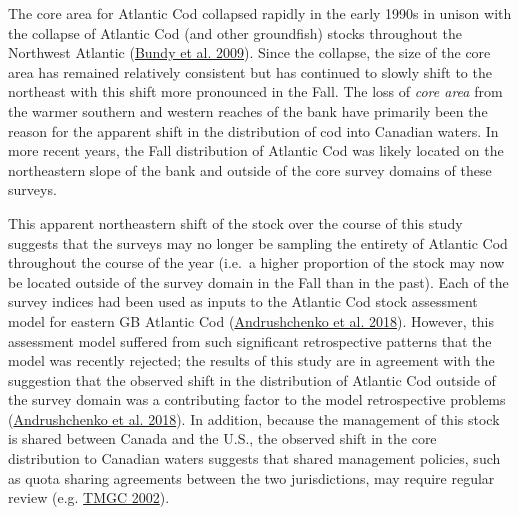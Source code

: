 \documentclass[
]{article}
\begin{document}
The core area for Atlantic Cod collapsed rapidly in the early 1990s in unison with the collapse of Atlantic Cod (and other groundfish) stocks throughout the Northwest Atlantic (\protect\hyperlink{ref-bundySealsCodForage2009}{Bundy et al. 2009}). Since the collapse, the size of the core area has remained relatively consistent but has continued to slowly shift to the northeast with this shift more pronounced in the Fall. The loss of \emph{core area} from the warmer southern and western reaches of the bank have primarily been the reason for the apparent shift in the distribution of cod into Canadian waters. In more recent years, the Fall distribution of Atlantic Cod was likely located on the northeastern slope of the bank and outside of the core survey domains of these surveys.

This apparent northeastern shift of the stock over the course of this study suggests that the surveys may no longer be sampling the entirety of Atlantic Cod throughout the course of the year (i.e.~a higher proportion of the stock may now be located outside of the survey domain in the Fall than in the past). Each of the survey indices had been used as inputs to the Atlantic Cod stock assessment model for eastern GB Atlantic Cod (\protect\hyperlink{ref-andrushchenkoAssessmentEasternGeorges2018}{Andrushchenko et al. 2018}). However, this assessment model suffered from such significant retrospective patterns that the model was recently rejected; the results of this study are in agreement with the suggestion that the observed shift in the distribution of Atlantic Cod outside of the survey domain was a contributing factor to the model retrospective problems (\protect\hyperlink{ref-andrushchenkoAssessmentEasternGeorges2018}{Andrushchenko et al. 2018}). In addition, because the management of this stock is shared between Canada and the U.S., the observed shift in the core distribution to Canadian waters suggests that shared management policies, such as quota sharing agreements between the two jurisdictions, may require regular review (e.g. \protect\hyperlink{ref-tmgcDevelopmentSharingAllocation2002}{TMGC 2002}).
\end{document}
